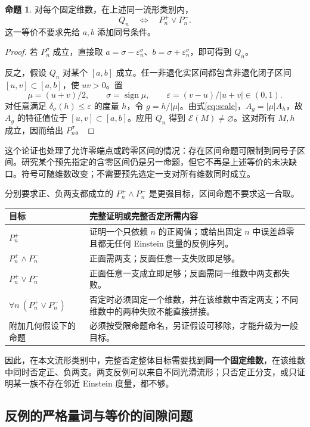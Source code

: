 \documentclass[11pt,a4paper]{article}
\theoremstyle{definition}
\newtheorem{proposition}[definition]{命题}
\newcommand{\Ein}{\mathcal E}
\begin{document}
\begin{proposition}\label{prop:branches}
对每个固定维数，在上述同一流形类别内，
\[
Q_n\quad\Longleftrightarrow\quad P_n^+\vee P_n^-.
\]
这一等价不要求先给 $a,b$ 添加同号条件。
\end{proposition}
\begin{proof}
若 $P_n^\sigma$ 成立，直接取 $a=\sigma-\varepsilon_n^\sigma$、$b=\sigma+\varepsilon_n^\sigma$，即可得到 $Q_n$。

反之，假设 $Q_n$ 对某个 $[a,b]$ 成立。任一非退化实区间都包含非退化闭子区间 $[u,v]\subset[a,b]$，使 $uv>0$。置
\[
\mu=(u+v)/2,\qquad \sigma=\operatorname{sign}\mu,\qquad
\varepsilon=(v-u)/|u+v|\in(0,1).
\]
对任意满足 $\delta_\sigma(h)\le\varepsilon$ 的度量 $h$，令 $g=h/|\mu|$。由式\eqref{eq:scale}，$A_g=|\mu|A_h$，故 $A_g$ 的特征值位于 $[u,v]\subset[a,b]$。应用 $Q_n$ 得到 $\Ein(M)\ne\varnothing$。这对所有 $M,h$ 成立，因而给出 $P_n^\sigma$。
\end{proof}

这个论证也处理了允许零端点或跨零区间的情况：存在区间命题可限制到同号子区间。研究某个预先指定的含零区间仍是另一命题，但它不再是上述等价的未决缺口。符号可随维数改变；不需要预先选定一支对所有维数同时成立。

分别要求正、负两支都成立的 $P_n^+\wedge P_n^-$ 是更强目标，区间命题不要求这一合取。

\begin{longtable}{P{0.31\textwidth}P{0.62\textwidth}}
\toprule
目标 & 完整证明或完整否定所需内容\\\midrule
$P_n^+$ & 证明一个只依赖 $n$ 的正阈值；或给出固定 $n$ 中误差趋零且都无任何 Einstein 度量的反例序列。\\
$P_n^+\wedge P_n^-$ & 正面需两支；反面任意一支失败即足够。\\
$P_n^+\vee P_n^-$ & 正面任意一支成立即足够；反面需同一维数中两支都失败。\\
$\forall n\ (P_n^+\vee P_n^-)$ & 否定时必须固定一个维数，并在该维数中否定两支；不同维数中的两种失败不能直接拼接。\\
附加几何假设下的命题 & 必须按受限命题命名，另证假设可移除，才能升级为一般目标。\\\bottomrule
\end{longtable}

因此，在本文流形类别中，完整否定整体目标需要找到\textbf{同一个固定维数}，在该维数中同时否定正、负两支。两支反例可以来自不同光滑流形；只否定正分支，或只证明某一族不存在邻近 Einstein 度量，都不够。

\subsection{反例的严格量词与等价的间隙问题}
\end{document}

